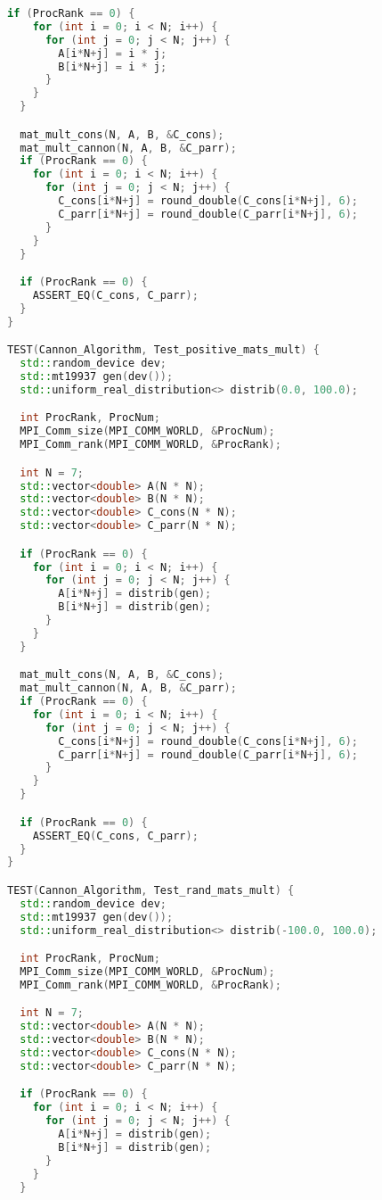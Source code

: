 \documentclass{report}
\begin{document}
\begin{lstlisting}[language=C++]
  if (ProcRank == 0) {
    for (int i = 0; i < N; i++) {
      for (int j = 0; j < N; j++) {
        A[i*N+j] = i * j;
        B[i*N+j] = i * j;
      }
    }
  }

  mat_mult_cons(N, A, B, &C_cons);
  mat_mult_cannon(N, A, B, &C_parr);
  if (ProcRank == 0) {
    for (int i = 0; i < N; i++) {
      for (int j = 0; j < N; j++) {
        C_cons[i*N+j] = round_double(C_cons[i*N+j], 6);
        C_parr[i*N+j] = round_double(C_parr[i*N+j], 6);
      }
    }
  }

  if (ProcRank == 0) {
    ASSERT_EQ(C_cons, C_parr);
  }
}

TEST(Cannon_Algorithm, Test_positive_mats_mult) {
  std::random_device dev;
  std::mt19937 gen(dev());
  std::uniform_real_distribution<> distrib(0.0, 100.0);

  int ProcRank, ProcNum;
  MPI_Comm_size(MPI_COMM_WORLD, &ProcNum);
  MPI_Comm_rank(MPI_COMM_WORLD, &ProcRank);

  int N = 7;
  std::vector<double> A(N * N);
  std::vector<double> B(N * N);
  std::vector<double> C_cons(N * N);
  std::vector<double> C_parr(N * N);

  if (ProcRank == 0) {
    for (int i = 0; i < N; i++) {
      for (int j = 0; j < N; j++) {
        A[i*N+j] = distrib(gen);
        B[i*N+j] = distrib(gen);
      }
    }
  }

  mat_mult_cons(N, A, B, &C_cons);
  mat_mult_cannon(N, A, B, &C_parr);
  if (ProcRank == 0) {
    for (int i = 0; i < N; i++) {
      for (int j = 0; j < N; j++) {
        C_cons[i*N+j] = round_double(C_cons[i*N+j], 6);
        C_parr[i*N+j] = round_double(C_parr[i*N+j], 6);
      }
    }
  }

  if (ProcRank == 0) {
    ASSERT_EQ(C_cons, C_parr);
  }
}

TEST(Cannon_Algorithm, Test_rand_mats_mult) {
  std::random_device dev;
  std::mt19937 gen(dev());
  std::uniform_real_distribution<> distrib(-100.0, 100.0);

  int ProcRank, ProcNum;
  MPI_Comm_size(MPI_COMM_WORLD, &ProcNum);
  MPI_Comm_rank(MPI_COMM_WORLD, &ProcRank);

  int N = 7;
  std::vector<double> A(N * N);
  std::vector<double> B(N * N);
  std::vector<double> C_cons(N * N);
  std::vector<double> C_parr(N * N);

  if (ProcRank == 0) {
    for (int i = 0; i < N; i++) {
      for (int j = 0; j < N; j++) {
        A[i*N+j] = distrib(gen);
        B[i*N+j] = distrib(gen);
      }
    }
  }


\end{lstlisting}
\end{document}
